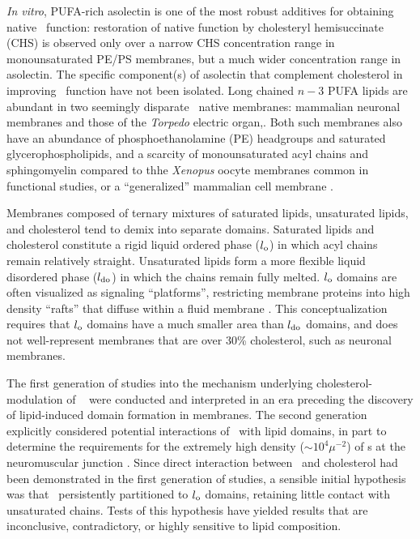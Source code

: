 {\it In vitro}, PUFA-rich asolectin\citep{Regost2003,Olsen2003} is one of the most robust additives\citep{Criado1982} for obtaining native \nachr~function: restoration of native function by cholesteryl hemisuccinate (CHS) is observed only over a narrow CHS concentration range in monounsaturated PE/PS membranes, but a much wider concentration range in asolectin\citep{Criado1982}. The specific component(s) of asolectin that complement cholesterol in improving \nachr~function have not been isolated. 
Long chained $n-3$  
PUFA lipids are abundant in two seemingly disparate \nachr~native membranes: mammalian neuronal membranes\citep{Breckenridge_Adult_1973,Isolated1969} and those of the \textit{Torpedo} electric organ,\citep{Barrantes1989a,Quesada2016}. Both such membranes also have an abundance of phosphoethanolamine (PE) headgroups and saturated glycerophospholipids, and a scarcity of monounsaturated acyl chains and sphingomyelin compared to thhe \textit{Xenopus} oocyte membranes \citep{Gamba2005} common in functional studies, or a ``generalized'' mammalian cell membrane \citep{Ingolfsson2014}.    

Membranes composed of ternary mixtures of saturated lipids, unsaturated lipids, and cholesterol tend to demix into separate domains. Saturated lipids and cholesterol constitute a rigid liquid ordered phase ($l_{\mathrm{o}}$) in which acyl chains remain relatively straight. \citep{Feller_Acyl_2008,Yeagle2016115,Cicuta1981,Bleecker2016} Unsaturated lipids form a more flexible liquid disordered phase ($l_{\mathrm{do}}$) in which the chains remain fully melted.  
$l_{\mathrm{o}}$ domains are often visualized as signaling ``platforms'', restricting membrane proteins into high density ``rafts'' that diffuse within a fluid membrane {\citep{Simons1997,Simons2000}}. This conceptualization requires that $l_{\mathrm{o}}$ domains have a much smaller area than $l_{\mathrm{do}}$ domains, and does not well-represent membranes that are over 30\% cholesterol, such as neuronal membranes.   

The first generation of studies into the mechanism underlying cholesterol-modulation of \nachr~ were conducted and interpreted in an era preceding the discovery of lipid-induced domain formation in membranes. 
The second generation explicitly considered potential interactions of \nachr~with lipid domains, in part to determine the requirements for the extremely high density  ($\sim10^{4}\mu^{-2}$) of \nachr s at the neuromuscular junction \citep{Breckenridge1972}.  Since direct interaction between \nachr~and cholesterol had been demonstrated in the first generation of studies, a sensible initial hypothesis was that \nachr~persistently partitioned to $l_{\mathrm{o}}$ domains, retaining little contact with unsaturated chains.  Tests of this hypothesis have yielded results that are inconclusive, contradictory, or highly sensitive to lipid composition.     

